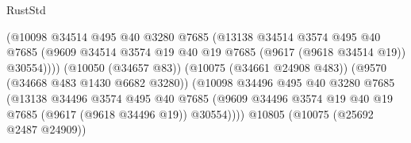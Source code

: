 \begin{lexlean}{RustStd}
\begin{coremodule}
                                            (@10098
                                              @34514
                                              @495
                                              @40
                                              @3280
                                              @7685
                                              (@13138
                                                @34514
                                                @3574
                                                @495
                                                @40
                                                @7685
                                                (@9609
                                                  @34514
                                                  @3574
                                                  @19
                                                  @40
                                                  @19
                                                  @7685
                                                  (@9617 (@9618 @34514 @19))
                                                  @30554))))
                                          (@10050 (@34657 @83))
                                          (@10075 (@34661 @24908 @483))
                                          (@9570 (@34668 @483 @1430 @6682 @3280))
                                          (@10098
                                            @34496
                                            @495
                                            @40
                                            @3280
                                            @7685
                                            (@13138
                                              @34496
                                              @3574
                                              @495
                                              @40
                                              @7685
                                              (@9609
                                                @34496
                                                @3574
                                                @19
                                                @40
                                                @19
                                                @7685
                                                (@9617 (@9618 @34496 @19))
                                                @30554))))
                                        @10805
                                        (@10075 (@25692 @2487 @24909))

\end{coremodule}
\end{lexlean}
